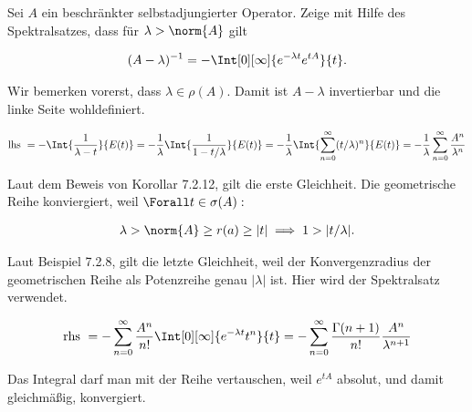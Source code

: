 \begin{exercise}[37/3]

Sei $A$ ein beschränkter selbstadjungierter Operator.
Zeige mit Hilfe des Spektralsatzes, dass für $\lambda > \norm{A}$ gilt

\begin{align*}
  (A - \lambda)^{-1}
  =
  -\Int[0][\infty]{e^{-\lambda t} e^{t A}}{t}.
\end{align*}

\end{exercise}

\begin{solution}

\phantom{}


Wir bemerken vorerst, dass $\lambda \in \rho(A)$.
Damit ist $A - \lambda$ invertierbar und die linke Seite wohldefiniert.

\begin{align*}
  \text{lhs}~
  =
  -\Int{\frac{1}{\lambda - t}}{E(t)}
  =
  -\frac{1}{\lambda}
  \Int{\frac{1}{1 - t / \lambda}}{E(t)}
  =
  -\frac{1}{\lambda}
  \Int{\sum_{n=0}^\infty (t / \lambda)^n}{E(t)}
  =
  -\frac{1}{\lambda}
  \sum_{n=0}^\infty
  \frac{A^n}{\lambda^n}
\end{align*}


Laut dem Beweis von Korollar 7.2.12, gilt die erste Gleichheit.
Die geometrische Reihe konviergiert, weil $\Forall t \in \sigma(A):$

\begin{align*}
  \lambda > \norm{A} \geq r(a) \geq |t|
  \implies
  1 > |t / \lambda|.
\end{align*}


Laut Beispiel 7.2.8, gilt die letzte Gleichheit, weil der Konvergenzradius der geometrischen Reihe als Potenzreihe genau $|\lambda|$ ist.
Hier wird der Spektralsatz verwendet.

\begin{align*}
  \text{rhs}~
  =
  -\sum_{n=0}^\infty
  \frac{A^n}{n!}
  \Int[0][\infty]{e^{-\lambda t} t^n}{t}
  =
  -\sum_{n=0}^\infty
  \frac{\Gamma(n+1)}{n!}
  \frac{A^n}{\lambda^{n+1}}
\end{align*}

Das Integral darf man mit der Reihe vertauschen, weil $e^{t A}$ absolut, und damit gleichmäßig, konvergiert.


\end{solution}
